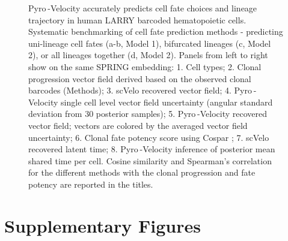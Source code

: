 \documentclass[
  sn-mathphys-num,
  lineno,
  twocolumn]{sn-jnl}
\begin{document}
\begin{figure}


\caption{\label{fig-lineage-tracing}Pyro -Velocity accurately predicts
cell fate choices and lineage trajectory in human LARRY barcoded
hematopoietic cells. Systematic benchmarking of cell fate prediction
methods - predicting uni-lineage cell fates (a-b, Model 1), bifurcated
lineages (c, Model 2), or all lineages together (d, Model 2). Panels
from left to right show on the same SPRING embedding: 1. Cell types; 2.
Clonal progression vector field derived based on the observed clonal
barcodes (Methods); 3. scVelo recovered vector field; 4. Pyro -Velocity
single cell level vector field uncertainty (angular standard deviation
from 30 posterior samples); 5. Pyro -Velocity recovered vector field;
vectors are colored by the averaged vector field uncertainty; 6. Clonal
fate potency score using Cospar \citep{Wang2022-xb}; 7. scVelo recovered
latent time; 8. Pyro -Velocity inference of posterior mean shared time
per cell. Cosine similarity and Spearman's correlation for the different
methods with the clonal progression and fate potency are reported in the
titles.}

\end{figure}%

\FloatBarrier
\clearpage

\newpage{}

\section{Supplementary Figures}\label{supplementary-figures}
\end{document}
